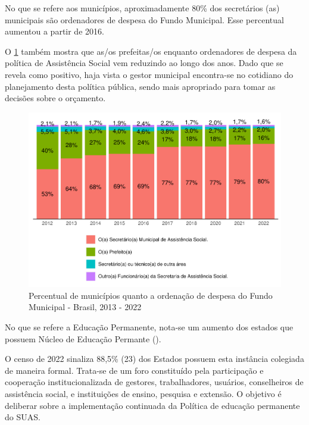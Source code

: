 \documentclass[
  brazilian]{report}
\begin{document}
No que se refere aos municípios, aproximadamente 80\% dos secretários
(as) municipais são ordenadores de despesa do Fundo Municipal. Esse
percentual aumentou a partir de 2016.

O \cref{fig:munic_ord_despesa} também mostra que as/os prefeitas/os
enquanto ordenadores de despesa da política de Assistência Social vem
reduzindo ao longo dos anos. Dado que se revela como positivo, haja
vista o gestor municipal encontra-se no cotidiano do planejamento desta
política pública, sendo mais apropriado para tomar as decisões sobre o
orçamento.

\begin{figure}
\includegraphics{Censo-SUAS-2022_files/figure-latex/munic_ord_despesa-1} \caption[Percentual de municípios quanto a ordenação de despesa do Fundo Municipal - Brasil, 2013 - 2022]{Percentual de municípios quanto a ordenação de despesa do Fundo Municipal - Brasil, 2013 - 2022}\label{fig:munic_ord_despesa}
\end{figure}

No que se refere a Educação Permanente, nota-se um aumento dos estados
que possuem Núcleo de Educação Permante ().

O censo de 2022 sinaliza 88,5\% (23) dos Estados possuem esta instância
colegiada de maneira formal. Trata-se de um foro constituído pela
participação e cooperação institucionalizada de gestores, trabalhadores,
usuários, conselheiros de assistência social, e instituições de ensino,
pesquisa e extensão. O objetivo é deliberar sobre a implementação
continuada da Política de educação permanente do SUAS.
\end{document}
